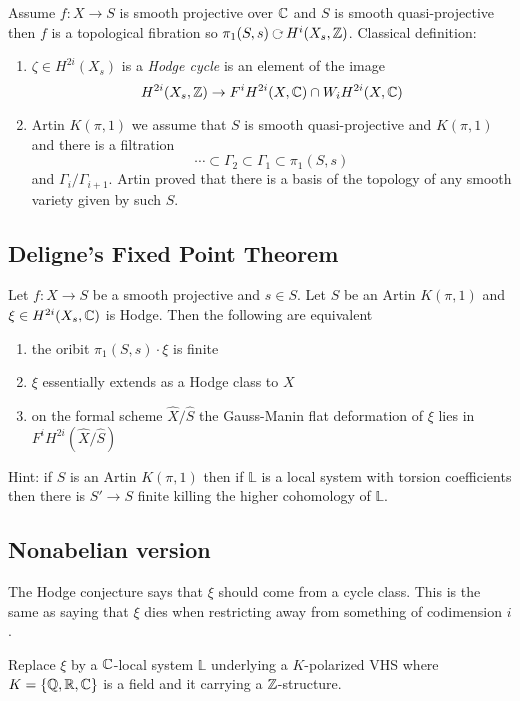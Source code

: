 \documentclass[12pt]{article}
\newcommand{\LL}{\mathbb{L}}
\begin{document}
Assume $f : X \to S$ is smooth projective over $\mathbb{C}$ and $S$ is smooth quasi-projective then $f$ is a topological fibration so $\pi_1(S,s) \acts H^i(X_s, \ZZ)$. Classical definition:
\begin{enumerate}
\item $\zeta \in H^{2i}(X_s)$ is a \textit{Hodge cycle} is an element of the image
\[ H^{2i}(X_s, \mathbb{Z}) \to F^i H^{2i}(X, \mathbb{C}) \cap W_i H^{2i}(X, \mathbb{C}) \]

\item Artin $K(\pi, 1)$ we assume that $S$ is smooth quasi-projective and $K(\pi, 1)$ and there is a filtration
\[ \cdots \subset \Gamma_2 \subset \Gamma_1 \subset \pi_1(S, s) \]
and $\Gamma_i / \Gamma_{i+1}$. Artin proved that there is a basis of the topology of any smooth variety given by such $S$. 
\end{enumerate}

\subsection{Deligne's Fixed Point Theorem}

Let $f : X \to S$ be a smooth projective and $s \in S$. Let $S$ be an Artin $K(\pi,1)$ and $\xi \in H^{2i}(X_s, \mathbb{C})$ is Hodge. Then the following are equivalent
\begin{enumerate}
\item the oribit $\pi_1(S, s) \cdot \xi$ is finite
\item $\xi$ essentially extends as a Hodge class to $X$
\item on the formal scheme $\hat{X} / \hat{S}$ the Gauss-Manin flat deformation of $\xi$ lies in $F^i H^{2i}(\hat{X} / \hat{S})$
\end{enumerate}

Hint: if $S$ is an Artin $K(\pi, 1)$ then if $\LL$ is a local system with torsion coefficients then there is $S' \to S$ finite \etale killing the higher cohomology of $\LL$. 

\subsection{Nonabelian version}

The Hodge conjecture says that $\xi$ should come from a cycle class. This is the same as saying that $\xi$ dies when restricting away from something of codimension $i$. 

Replace $\xi$ by a $\mathbb{C}$-local system $\LL$ underlying a $K$-polarized VHS where $K = \{ \mathbb{Q}, \mathbb{R}, \mathbb{C} \}$ is a field and it carrying a $\mathbb{Z}$-structure. 
\end{document}
